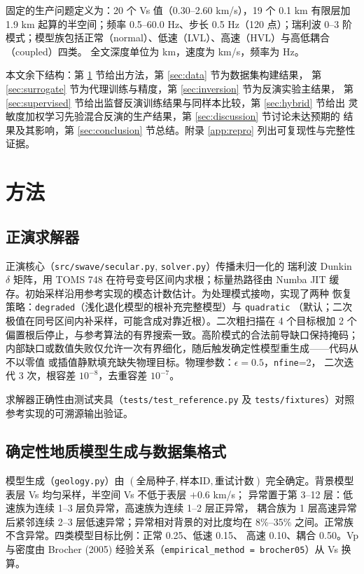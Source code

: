 \documentclass[UTF8,a4paper,11pt]{ctexart}
\begin{document}
固定的生产问题定义为：20 个 Vs 值（0.30--2.60 km/s），19 个 0.1 km 有限层加
1.9 km 起算的半空间；频率 0.5--60.0 Hz、步长 0.5 Hz（120 点）；瑞利波 0--3 阶
模式；模型族包括正常（normal）、低速（LVL）、高速（HVL）与高低耦合（coupled）四类。
全文深度单位为 km，速度为 km/s，频率为 Hz。

本文余下结构：第 \ref{sec:method} 节给出方法，第 \ref{sec:data} 节为数据集构建结果，
第 \ref{sec:surrogate} 节为代理训练与精度，第 \ref{sec:inversion} 节为反演实验主结果，
第 \ref{sec:supervised} 节给出监督反演训练结果与同样本比较，第 \ref{sec:hybrid} 节给出
灵敏度加权学习先验混合反演的生产结果，第 \ref{sec:discussion} 节讨论未达预期的
结果及其影响，第 \ref{sec:conclusion} 节总结。附录 \ref{app:repro} 列出可复现性与完整性证据。

\section{方法}\label{sec:method}

\subsection{正演求解器}
正演核心（\texttt{src/swave/secular.py}, \texttt{solver.py}）传播未归一化的
瑞利波 Dunkin \(\delta\) 矩阵，用 TOMS 748 在符号变号区间内求根；标量热路径由
Numba JIT 缓存。初始采样沿用参考实现的模态计数估计。为处理模式接吻，实现了两种
恢复策略：\texttt{degraded}（浅化退化模型的根补充完整模型）与 \texttt{quadratic}
（默认；二次极值在同号区间内补采样，可能含成对靠近根）。二次粗扫描在 4 个目标根加
2 个偏置根后停止，与参考算法的有界搜索一致。高阶模式的合法前导缺口保持掩码；
内部缺口或数值失败仅允许一次有界细化，随后触发确定性模型重生成——代码从不以零值
或插值静默填充缺失物理目标。物理参数：\(\epsilon=0.5\)，\texttt{nfine}=2，
二次迭代 3 次，根容差 \(10^{-8}\)，去重容差 \(10^{-7}\)。

求解器正确性由测试夹具（\texttt{tests/test\_reference.py} 及
\texttt{tests/fixtures}）对照参考实现的可溯源输出验证。

\subsection{确定性地质模型生成与数据集格式}
模型生成（\texttt{geology.py}）由 \((\text{全局种子},\text{样本ID},\text{重试计数})\)
完全确定。背景模型表层 Vs 均匀采样，半空间 Vs 不低于表层 \(+0.6\) km/s；
异常置于第 3--12 层：低速族为连续 1--3 层负异常，高速族为连续 1--2 层正异常，
耦合族为 1 层高速异常后紧邻连续 2--3 层低速异常；异常相对背景的对比度均在
8\%--35\% 之间。正常族不含异常。四类模型目标比例：正常 0.25、低速 0.15、
高速 0.10、耦合 0.50。Vp 与密度由
Brocher (2005) 经验关系（\texttt{empirical\_method = brocher05}）从 Vs 换算。
\end{document}
